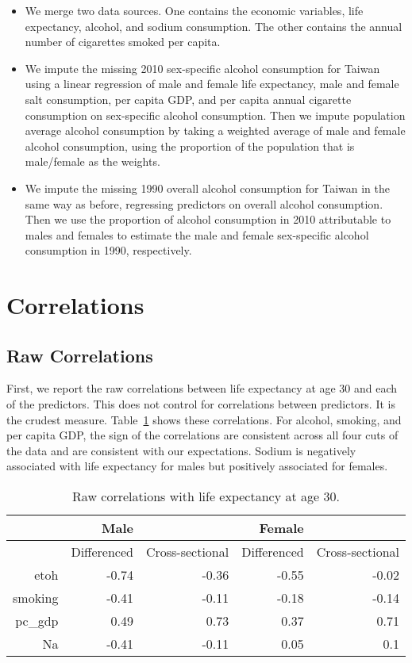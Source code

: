 \documentclass[11pt]{article}\usepackage[]{graphicx}\usepackage[]{color}
\begin{document}
\begin{itemize}
\item We merge two data sources. One contains the economic variables, life expectancy, alcohol, and sodium consumption. The other contains the annual number of cigarettes smoked per capita.
\item We impute the missing 2010 sex-specific alcohol consumption for Taiwan using a linear regression of male and female life expectancy, male and female salt consumption, per capita GDP, and per capita annual cigarette consumption on sex-specific alcohol consumption. Then we impute population average alcohol consumption by taking a weighted average of male and female alcohol consumption, using the proportion of the population that is male/female as the weights.
\item We impute the missing 1990 overall alcohol consumption for Taiwan in the same way as before, regressing predictors on overall alcohol consumption. Then we use the proportion of alcohol consumption in 2010 attributable to males and females to estimate the male and female sex-specific alcohol consumption in 1990, respectively.
\end{itemize}





\section{Correlations}
\subsection{Raw Correlations}
First, we report the raw correlations between life expectancy at age 30 and each of the predictors.
This does not control for correlations between predictors.
It is the crudest measure.
Table~\ref{tab:raw_corr} shows these correlations.
For alcohol, smoking, and per capita GDP, the sign of the correlations are consistent across all four cuts of the data and are consistent with our expectations.
Sodium is negatively associated with life expectancy for males but positively associated for females.

\begin{table}[ht]
\centering
\begin{tabular}{r|rr|rr}
   \hline
 & Male &  & Female &  \\ 
   \hline
   & Differenced & Cross-sectional & Differenced & Cross-sectional \\ 
   \hline
etoh & -0.74 & -0.36 & -0.55 & -0.02 \\ 
  smoking & -0.41 & -0.11 & -0.18 & -0.14 \\ 
  pc\_gdp & 0.49 & 0.73 & 0.37 & 0.71 \\ 
  Na & -0.41 & -0.11 & 0.05 & 0.1 \\ 
   \hline
\end{tabular}
\caption{Raw correlations with life expectancy at age 30.} 
\label{tab:raw_corr}
\end{table}
\end{document}
